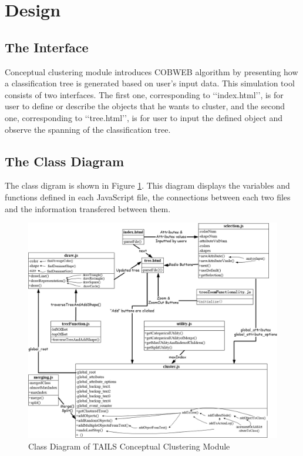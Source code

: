 %
%
%
\section{Design}
\subsection{The Interface}
Conceptual clustering module introduces COBWEB algorithm by presenting how a classification tree is generated based on user's input data. This simulation tool consists of two interfaces. The first one, corresponding to \lq\lq index.html\rq\rq, is for user to define or describe the objects that he wants to cluster, and the second one, corresponding to \lq\lq tree.html\rq\rq, is for user to input the defined object and observe the spanning of the classification tree. %

\subsection{The Class Diagram}
The class digram is shown in Figure \ref{Fig:ClassDiagram}. This diagram displays the variables and functions defined in each JavaScript file, the connections between each two files and the information transfered between them.
\begin{figure}[h!]
    \centering
    \includegraphics[width=400pt]{../images/class_diagram_for_Conceptual_Clustering.jpg}
    \caption{Class Diagram of TAILS Conceptual Clustering Module}
    \label{Fig:ClassDiagram}
\end{figure}

